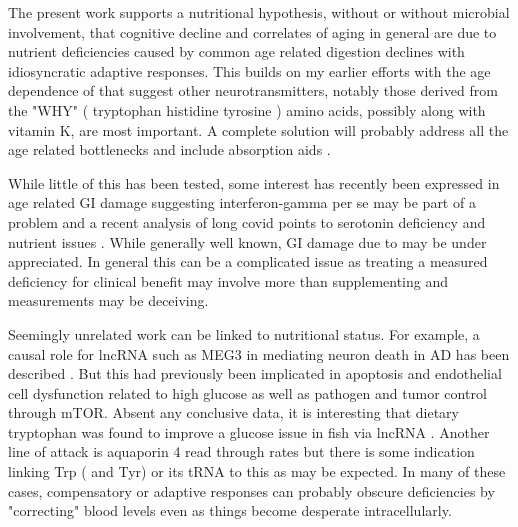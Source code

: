 \documentclass[aps,secnumarabic,balancelastpage,amsmath,amssymb,nofootinbib]{revtex4}
\newcommand{\mjmtol}[1]{
 \fbox{  
\begin{minipage}[t]{\textwidth}
{ \centering{\bf{Thinking outloud}} }
\par   
#1 
\end{minipage} 
}
}
\begin{document}
The present work supports a nutritional hypothesis,
without or without microbial involvement,  that
cognitive decline and correlates of aging in general are due
to nutrient deficiencies  
caused by common age related digestion declines with idiosyncratic
adaptive responses. 
This builds on my earlier efforts with the age
dependence of \mjmdisease  
\cite{mmarchywka-MJM-2020-002-0.10}
\cite{mmarchywka-MJM-2020-002-0.12rg} 
that suggest other neurotransmitters, notably
those derived from the "WHY" ( tryptophan histidine tyrosine ) 
amino acids, possibly along with
vitamin K, are most important.
A complete solution will probably address all the age related bottlenecks 
and include absorption aids
\cite{ mmarchywka-MJM-2021-007-.1-table-rg}
\cite{marchywka-MJM-2022-009-0.50rg}
\cite{marchywka-MJM-2022-013-0.10}
\cite{marchywka-MJM-2021-014-0.80-rg}
\cite{marchywka-MJM-2021-018-0.50rg}.

While little of this has been tested, 
some interest has recently been expressed in age
related GI damage suggesting interferon-gamma per se
may be part of a problem 
\cite{Omrani_Krepelova_Rasa_IFNupgamma_Stat1_axis_drives_2023}
and a recent analysis of long covid points to serotonin deficiency
and nutrient issues \cite{PMID37848036}. While generally well
known, GI damage due to \mjmvirus may be under appreciated.
In general this can be a complicated issue as treating
a measured deficiency for clinical benefit  may 
involve more than supplementing and measurements may be deceiving.

Seemingly unrelated work can be linked to nutritional status.
For example, a  causal role for lncRNA such as MEG3
in mediating neuron death in AD has been described
\cite{Balusu_Horre_Thrupp_MEG3_activates_necroptosis_2023}.
But this had previously been implicated
in apoptosis and endothelial cell dysfunction 
related to high glucose \cite{PMC6958101}
\cite{Tong_Peng_Gu_LncRNA_MEG3_alleviates_high_2019}
as well as pathogen 
\cite{Pawar_Hanisch_PalmaVera_Down_regulated_lncRNA_MEG3_2016}
and tumor control \cite{YAN2023109340} through mTOR. 
Absent any conclusive data, 
it is interesting that 
 dietary tryptophan was found to improve  a glucose issue 
in fish via lncRNA \cite{JIA2021737256}.
Another line of attack is  aquaporin 4  
 read through rates \cite{PMC10566184}
but there is some indication linking Trp ( and Tyr)  or its tRNA 
to this \cite{PMC8136774} as may be expected.
In many of these cases, compensatory or adaptive responses
can probably obscure deficiencies by "correcting" blood levels
even as things become desperate intracellularly.
\begin{comment}
Its also worth noting that in the past  coding regions 
had been given the most
attention while the more idiosyncratic regulatory issues
had been ignored. Control and feedback may be important responses
to various stimuli including nutrition but much analysis 
assumes monotonic static correlations based on enzyme  functions. 
\end{comment}
\end{document}
